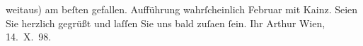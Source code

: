 \begin{ledgroupsized}[t]{13cm}
                    weitaus) am beſten gefallen. \introOben{}Aufführung wahrſcheinlich
                            Februar mit Kainz.\introOben{}\pend
           \pstart
           Seien Sie herzlich gegrüßt und laſſen Sie uns bald zuſa{\geminationm}en ſein.\pend
           \pstart Ihr \spacefill\mbox{Arthur}\pend{}\pstart
           Wien,
                        14. X. 98.\pend
           
         
         \endnumbering{}\end{ledgroupsized}  \newcommand{\dateiname}{L00853}\newcommand{\titel}{Arthur Schnitzler an Hugo von Hofmannsthal, 14. 10. 1898}\newcommand{\editorInnen}{Martin Anton Müller und Gerd-Hermann Susen}
      